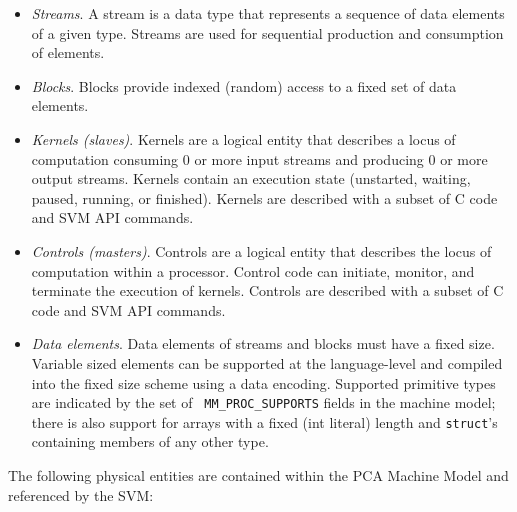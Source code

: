 \begin{itemize}

\item {\it Streams}.  A stream is a data type that represents a
sequence of data elements of a given type.  Streams are used for
sequential production and consumption of elements.

\item {\it Blocks}. Blocks provide indexed (random) access to a fixed
set of data elements.

\item {\it Kernels (slaves)}. Kernels are a logical entity that
describes a locus of computation consuming 0 or more input streams and
producing 0 or more output streams.  Kernels contain an execution
state (unstarted, waiting, paused, running, or finished).  Kernels are
described with a subset of C code and SVM API commands.

\item {\it Controls (masters)}. Controls are a logical entity that
describes the locus of computation within a processor.  Control code
can initiate, monitor, and terminate the execution of kernels.
Controls are described with a subset of C code and SVM API commands.

\item {\it Data elements}. Data elements of streams and blocks must
have a fixed size.  Variable sized elements can be supported at the
language-level and compiled into the fixed size scheme using a data
encoding.  Supported primitive types are indicated by the set of {\tt
MM\_PROC\_SUPPORTS} fields in the machine model; there is also support
for arrays with a fixed (int literal) length and {\tt struct}'s
containing members of any other type.

\end{itemize}


The following physical entities are contained within the PCA Machine
Model and referenced by the SVM:

